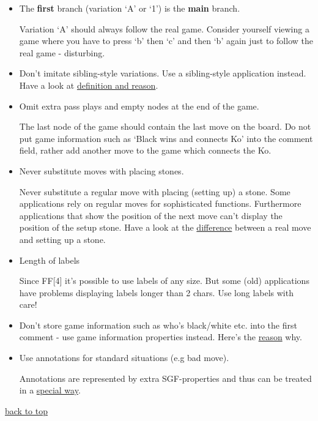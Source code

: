 \begin{itemize}
\item
  The \textbf{first} branch (variation `A' or `1') is the \textbf{main}
  branch.

  Variation `A' should always follow the real game. Consider yourself
  viewing a game where you have to press `b' then `c' and then `b' again
  just to follow the real game - disturbing.
\item
  Don't imitate sibling-style variations. Use a sibling-style
  application instead. Have a look at
  \href{https://red-bean.com/sgf/user_guide/index.html\#variations}{definition
  and reason}.
\item
  Omit extra pass plays and empty nodes at the end of the game.

  The last node of the game should contain the last move on the board.
  Do not put game information such as `Black wins and connects Ko' into
  the comment field, rather add another move to the game which connects
  the Ko.
\item
  Never substitute moves with placing stones.

  Never substitute a regular move with placing (setting up) a stone.
  Some applications rely on regular moves for sophisticated functions.
  Furthermore applications that show the position of the next move can't
  display the position of the setup stone. Have a look at the
  \href{https://red-bean.com/sgf/user_guide/index.html\#move_vs_place}{difference}
  between a real move and setting up a stone.
\item
  Length of labels

  Since FF{[}4{]} it's possible to use labels of any size. But some
  (old) applications have problems displaying labels longer than 2
  chars. Use long labels with care!
\item
  Don't store game information such as who's black/white etc. into the
  first comment - use game information properties instead. Here's the
  \href{https://red-bean.com/sgf/user_guide/index.html\#why_gameinfo}{reason}
  why.
\item
  Use annotations for standard situations (e.g bad move).

  Annotations are represented by extra SGF-properties and thus can be
  treated in a
  \href{https://red-bean.com/sgf/user_guide/index.html\#annotations}{special
  way}.
\end{itemize}

\href{https://red-bean.com/sgf/user_guide/index.html\#toc}{back to top}

